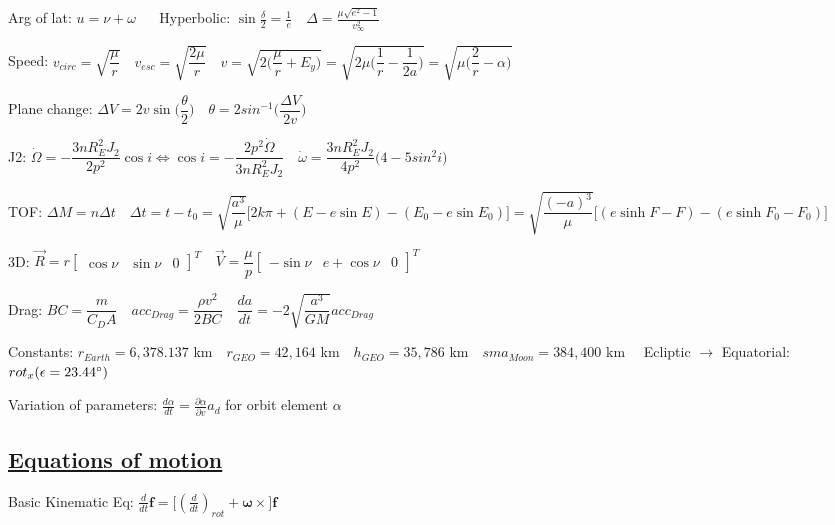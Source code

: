 \documentclass[11pt,landscape]{article}
\begin{document}
Arg of lat: $u = \nu + \omega$
$\quad$
Hyperbolic:
$
\sin \frac{\delta}{2} = \frac{1}{e}
\quad
\Delta = \frac{\mu \sqrt{e^2 - 1}}{v_{\infty}^2}
$

Speed:
$
v_{circ}=\sqrt{\dfrac{\mu}{r}}
\quad
v_{esc}=\sqrt{\dfrac{2\mu}{r}}
\quad
v
= \sqrt{2 \big( \dfrac{\mu}{r} + E_y \big) }
= \sqrt{2\mu \big( \dfrac{1}{r} - \dfrac{1}{2a} \big) }
= \sqrt{\mu \big( \dfrac{2}{r} - \alpha \big) }
$

Plane change:
$
\Delta V = 2 v \sin \big( \dfrac{\theta}{2} \big)
\quad
\theta = 2 sin^{-1} \big( \dfrac{\Delta V}{2v} \big)
$

J2:
$
\dot{\Omega} = - \dfrac{3 n R_E^2 J_2}{2 p^2} \cos i
\Leftrightarrow
\cos i = - \dfrac{2 p^2 \dot{\Omega}}{3 n R_E^2 J_2}
\quad
\dot{\omega} = \dfrac{3 n R_E^2 J_2}{4 p^2} \big( 4 - 5 sin^2 i \big)
$

TOF:
$
\Delta M = n \Delta t
\quad
\Delta t = t - t_0
= \sqrt{\dfrac{a^3}{\mu}} \big[ 2 k \pi + (E-e\sin E) - (E_0-e\sin E_0) \big]
= \sqrt{\dfrac{(-a)^3}{\mu}} \big[ (e\sinh F - F) - (e\sinh F_0 - F_0) \big]
$

3D:
$
\vec{R} = r \begin{bmatrix} \cos\nu & \sin\nu & 0 \end{bmatrix}^T
\quad
\vec{V} = \dfrac{\mu}{p} \begin{bmatrix} -\sin\nu & e+\cos\nu & 0 \end{bmatrix}^T
$

Drag:
$
BC = \dfrac{m}{C_D A}
\quad
acc_{Drag} = \dfrac{\rho v^2}{2 BC}
\quad
\dfrac{da}{dt} = -2 \sqrt{\dfrac{a^3}{GM}} acc_{Drag}
$

Constants: 
$
r_{Earth} = 6,378.137 $ km$
\quad
r_{GEO} = 42,164 $ km$
\quad
h_{GEO} = 35,786 $ km$
\quad
sma_{Moon} = 384,400 $ km$
\quad
$
Ecliptic $\rightarrow$ Equatorial: $rot_x( \epsilon = 23.44\degree )$


Variation of parameters: 
$\frac{d\alpha}{dt} = \frac{\partial\alpha}{\partial v} a_d$
for orbit element $\alpha$


\newpage
\subsection{\underline{Equations of motion}}

\everymath{\displaystyle}

Basic Kinematic Eq:
$\frac{d}{dt} \bm f = \big[ (\frac{d}{dt})_{rot} + \bm\omega \times \big] \bm f$
\end{document}
